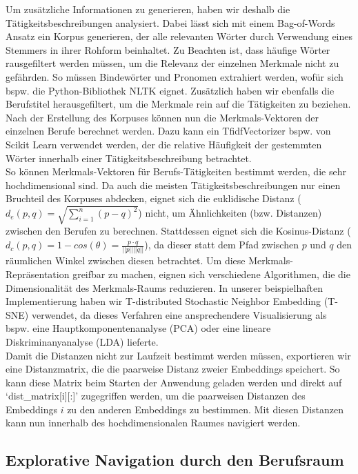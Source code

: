 \documentclass[10pt]{article}
\begin{document}
Um zusätzliche Informationen zu generieren, haben wir deshalb die
Tätigkeitsbeschreibungen analysiert. Dabei lässt sich mit einem Bag-of-Words
Ansatz ein Korpus generieren, der alle relevanten Wörter durch Verwendung eines
Stemmers in ihrer Rohform beinhaltet. Zu Beachten ist, dass häufige Wörter
rausgefiltert werden müssen, um die Relevanz der einzelnen Merkmale nicht zu
gefährden. So müssen Bindewörter und Pronomen extrahiert werden, wofür sich
bspw. die Python-Bibliothek NLTK eignet. Zusätzlich haben wir ebenfalls die
Berufstitel herausgefiltert, um die Merkmale rein auf die Tätigkeiten zu
beziehen. Nach der Erstellung des Korpuses können nun die Merkmals-Vektoren der
einzelnen Berufe berechnet werden. Dazu kann ein TfidfVectorizer bspw. von
Scikit Learn verwendet werden, der die relative Häufigkeit der gestemmten Wörter
innerhalb einer Tätigkeitsbeschreibung betrachtet.\\

So können Merkmals-Vektoren für Berufs-Tätigkeiten bestimmt werden, die sehr
hochdimensional sind. Da auch die meisten Tätigkeitsbeschreibungen nur einen
Bruchteil des Korpuses abdecken, eignet sich die euklidische Distanz ($d_e(p,q)
= \sqrt{\sum_{i=1}^n (p-q)^2}$) nicht, um Ähnlichkeiten (bzw. Distanzen)
zwischen den Berufen zu berechnen. Stattdessen eignet sich die Kosinus-Distanz
($d_c(p,q) = 1 - cos(\theta) = \frac{p \cdot q}{||p|| ||q||}$), da dieser statt
dem Pfad zwischen $p$ und $q$ den räumlichen Winkel zwischen diesen betrachtet.
Um diese Merkmals-Repräsentation greifbar zu machen, eignen sich verschiedene
Algorithmen, die die Dimensionalität des Merkmals-Raums reduzieren. In unserer
beispielhaften Implementierung haben wir T-distributed Stochastic Neighbor
Embedding (T-SNE) verwendet, da dieses Verfahren eine ansprechendere
Visualisierung als bspw. eine Hauptkomponentenanalyse (PCA) oder eine lineare
Diskriminanyanalyse (LDA) lieferte.\\

Damit die Distanzen nicht zur Laufzeit bestimmt werden müssen, exportieren wir
eine Distanzmatrix, die die paarweise Distanz zweier Embeddings speichert. So
kann diese Matrix beim Starten der Anwendung geladen werden und direkt auf
`dist\_matrix[i][:]' zugegriffen werden, um die paarweisen Distanzen des
Embeddings $i$ zu den anderen Embeddings zu bestimmen. Mit diesen Distanzen kann
nun innerhalb des hochdimensionalen Raumes navigiert werden.

\subsection{Explorative Navigation durch den Berufsraum}
\end{document}

